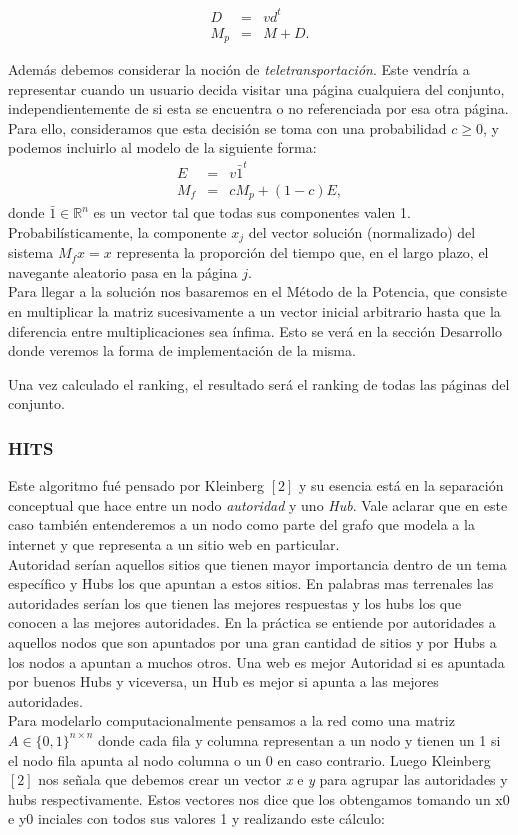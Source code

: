 \begin{eqnarray*}
D & = & v d^t \\
M_p & = & M + D.
\end{eqnarray*}
 

Además debemos considerar la noción de \emph{teletransportación}. Este vendría a representar cuando un usuario  decida visitar
una p\'agina cualquiera del conjunto, independientemente de si esta se encuentra o no referenciada por esa otra página. Para ello, consideramos que esta decisi\'on se toma con una probabilidad
$c \ge 0$, y podemos incluirlo al modelo de la siguiente forma:
\begin{eqnarray*}
E & = & v \bar{1}^t \\
M_f & = & cM_p + (1-c)E,
\end{eqnarray*}
\noindent donde $\bar{1} \in \mathbb{R}^n$ es un vector tal que todas sus componentes valen 1. Probabil\'isticamente, la
componente $x_j$ del vector soluci\'on (normalizado) del sistema $M_f x = x$ representa la proporci\'on del tiempo que,
en el largo plazo, el navegante aleatorio pasa en la p\'agina $j$. \\
Para llegar a la solución nos basaremos en el Método de la Potencia, que consiste en multiplicar la matriz sucesivamente a un vector inicial arbitrario hasta que la diferencia entre multiplicaciones sea ínfima. Esto se verá en la sección Desarrollo donde veremos la forma de implementación de la misma.


Una vez calculado el ranking, el resultado será el ranking de todas las páginas del conjunto.


\subsubsection{HITS}

Este algoritmo fué pensado por Kleinberg $[2]$ y su esencia está en la separación conceptual que hace entre un nodo \textit{autoridad} y uno \textit{Hub}. Vale aclarar que en este caso también entenderemos a un nodo como parte del grafo que modela a la internet y que representa a un sitio web en particular. \\
Autoridad serían aquellos sitios que tienen mayor importancia dentro de un tema específico y Hubs los que apuntan a estos sitios. En palabras mas terrenales las autoridades serían los que tienen las mejores respuestas y los hubs los que conocen a las mejores autoridades.
En la práctica se entiende por autoridades a aquellos nodos que son apuntados por una gran cantidad de sitios y por Hubs a los nodos a apuntan a muchos otros. Una web es mejor Autoridad si es apuntada por buenos Hubs y viceversa, un Hub es mejor si apunta a las mejores autoridades.\\
Para modelarlo computacionalmente pensamos a la red como una matriz $A \in \{0,1\}^{n \times n}$ donde cada fila y columna representan a un nodo y tienen un 1 si el nodo fila apunta al nodo columna o un 0 en caso contrario. Luego Kleinberg $[2]$  nos señala que debemos crear un vector \textit{x} e \textit{y} para agrupar las autoridades y hubs respectivamente. Estos vectores nos dice que los obtengamos tomando un x0 e y0 inciales con todos sus valores 1 y realizando este cálculo:

